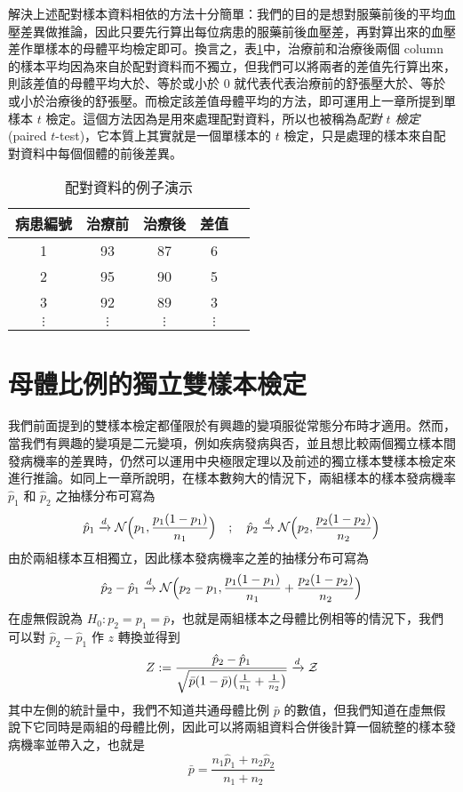     解決上述配對樣本資料相依的方法十分簡單：我們的目的是想對服藥前後的平均血壓差異做推論，因此只要先行算出每位病患的服藥前後血壓差，再對算出來的血壓差作單樣本的母體平均檢定即可。換言之，表\ref{tab:paired_data}中，治療前和治療後兩個 column 的樣本平均因為來自於配對資料而不獨立，但我們可以將兩者的差值先行算出來，則該差值的母體平均大於、等於或小於 $0$ 就代表代表治療前的舒張壓大於、等於或小於治療後的舒張壓。而檢定該差值母體平均的方法，即可運用上一章所提到單樣本 $t$ 檢定。這個方法因為是用來處理配對資料，所以也被稱為\textit{配對 $t$ 檢定} (paired $t$-test)，它本質上其實就是一個單樣本的 $t$ 檢定，只是處理的樣本來自配對資料中每個個體的前後差異。

    \begin{table}[htbp]
        \begin{center}
            \begin{tabular}{ccccc}
                \toprule
                病患編號 & 治療前 & 治療後 & 差值 \\
                \hline
                1 & 93 & 87 & 6 \\
                2 & 95 & 90 & 5 \\
                3 & 92 & 89 & 3 \\
                $\vdots$ & $\vdots$ & $\vdots$ & $\vdots$ \\
                \bottomrule
            \end{tabular}
            \caption{配對資料的例子演示\label{tab:paired_data}}
        \end{center}
    \end{table}

\section{母體比例的獨立雙樣本檢定}
    我們前面提到的雙樣本檢定都僅限於有興趣的變項服從常態分布時才適用。然而，當我們有興趣的變項是二元變項，例如疾病發病與否，並且想比較兩個獨立樣本間發病機率的差異時，仍然可以運用中央極限定理以及前述的獨立樣本雙樣本檢定來進行推論。如同上一章所說明，在樣本數夠大的情況下，兩組樣本的樣本發病機率 $\hat{p}_1$ 和 $\hat{p}_2$ 之抽樣分布可寫為
    \[\hat{p}_1 \xrightarrow[]{d} \mathcal{N}\Big(p_1, \frac{p_1(1-p_1)}{n_1}\Big) \quad ; \quad \hat{p}_2 \xrightarrow[]{d} \mathcal{N}\Big(p_2, \frac{p_2(1-p_2)}{n_2}\Big)\]
    由於兩組樣本互相獨立，因此樣本發病機率之差的抽樣分布可寫為
    \[\hat{p}_2 - \hat{p}_1 \xrightarrow[]{d} \mathcal{N}\Big(p_2 - p_1, \frac{p_1(1-p_1)}{n_1} + \frac{p_2(1-p_2)}{n_2}\Big)\]
    在虛無假說為 $H_0 : p_2 = p_1 = \bar{p}$，也就是兩組樣本之母體比例相等的情況下，我們可以對 $\hat{p}_2 - \hat{p}_1$ 作 $z$ 轉換並得到
    \[Z:=\frac{\hat{p}_2 - \hat{p}_1}{\sqrt{\bar{p}(1-\bar{p})\big(\frac{1}{n_1} + \frac{1}{n_2}\big)}} \xrightarrow[]{d} \mathcal{Z}\]
    其中左側的統計量中，我們不知道共通母體比例 $\bar{p}$ 的數值，但我們知道在虛無假說下它同時是兩組的母體比例，因此可以將兩組資料合併後計算一個統整的樣本發病機率並帶入之，也就是
    \[\bar{p} = \frac{n_1\hat{p}_1 + n_2\hat{p}_2}{n_1+n_2}\]
    
